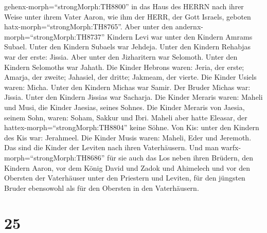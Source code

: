 gehenx-morph=``strongMorph:TH8800'' in das Haus des HERRN nach ihrer
Weise unter ihrem Vater Aaron, wie ihm der HERR, der Gott Israels,
geboten hatx-morph=``strongMorph:TH8765''.  Aber unter den
andernx-morph=``strongMorph:TH8737'' Kindern Levi war unter den Kindern
Amrams Subael. Unter den Kindern Subaels war Jehdeja. 
Unter den Kindern Rehabjas war der erste: Jissia.  Aber
unter den Jizharitern war Selomoth. Unter den Kindern Selomoths war
Jahath.  Die Kinder Hebrons waren: Jeria, der erste;
Amarja, der zweite; Jahasiel, der dritte; Jakmeam, der vierte.
 Die Kinder Usiels waren: Micha. Unter den Kindern Michas
war Samir.  Der Bruder Michas war: Jissia. Unter den
Kindern Jissias war Sacharja.  Die Kinder Meraris waren:
Maheli und Musi, die Kinder Jaesias, seines Sohnes.  Die
Kinder Meraris von Jaesia, seinem Sohn, waren: Soham, Sakkur und Ibri.
 Maheli aber hatte Eleasar, der
hattex-morph=``strongMorph:TH8804'' keine Söhne.  Von Kis:
unter den Kindern des Kis war: Jerahmeel.  Die Kinder Musis
waren: Maheli, Eder und Jeremoth. Das sind die Kinder der Leviten nach
ihren Vaterhäusern.  Und man
warfx-morph=``strongMorph:TH8686'' für sie auch das Los neben ihren
Brüdern, den Kindern Aaron, vor dem König David und Zadok und Ahimelech
und vor den Obersten der Vaterhäuser unter den Priestern und Leviten,
für den jüngsten Bruder ebensowohl als für den Obersten in den
Vaterhäusern.

\hypertarget{section-24}{%
\section{25}\label{section-24}}

